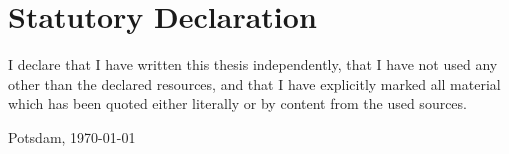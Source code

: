 \section*{Statutory Declaration}
I declare that I have written this thesis independently, that I have not used any other than the declared resources, and that I have explicitly marked all material which has been quoted either literally or by content from the used sources.

Potsdam, \today
~\\
~\\
~\\
